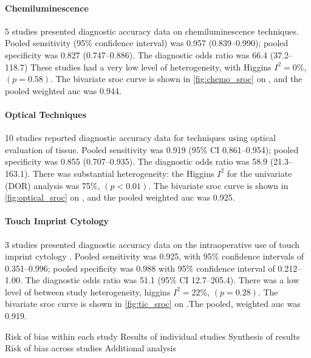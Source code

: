 \paragraph{Chemiluminescence}

5 studies presented diagnostic accuracy data on chemiluminescence techniques.
Pooled sensitivity (95\% confidence interval) was 0.957 (0.839--0.990); pooled specificity was 0.827 (0.747--0.886).
The diagnostic odds ratio was 66.4 (37.2--118.7)
These studies had a very low level of heterogeneity, with Higgins $I^2 = 0\%$, $(p=0.58)$.
The bivariate \gls{sroc} curve is shown in \cref{fig:chemo_sroc} on , and the pooled weighted \gls{auc} was 0.944.

\paragraph{Optical Techniques}

10 studies reported diagnostic accuracy data for techniques using optical evaluation of tissue.
Pooled sensitivity was 0.919 (95\% CI 0.861--0.954); pooled specificity was 0.855 (0.707--0.935).
The diagnostic odds ratio was 58.9 (21.3--163.1).
There was substantial heterogeneity: the Higgins $I^2$ for the univariate (DOR) analysis was 75\%, $(p<0.01)$.
The bivariate \gls{sroc} curve is shown in \cref{fig:optical_sroc} on , and the pooled weighted \gls{auc} was 0.925.

\paragraph{Touch Imprint Cytology}

3 studies presented diagnostic accuracy data on the intraoperative use of touch imprint cytology
.
Pooled sensitivity was 0.925, with 95\% confidence intervals of 0.351--0.996; pooled specificity was 0.988 with 95\% confidence interval of 0.212--1.00.
The diagnostic odds ratio was 51.1 (95\% CI 12.7--205.4).
There was a low level of between study heterogeneity, higgins $I^2 = 22\%$, $(p=0.28)$.
The bivariate \gls{sroc} curve is shown in \cref{fig:tic_sroc} on .The pooled, weighted \gls{auc} was 0.919.





Risk of bias within each study
Results of individual studies
Synthesis of results
Risk of bias across studies
Additional analysis

